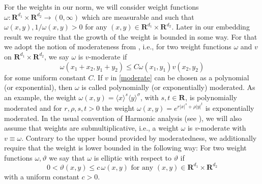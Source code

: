 \documentclass[a4paper]{article}
\newcommand{\rr}[1]{\mathbf{R}^{#1}}
\newcommand{\eabs}[1]{\langle #1\rangle}     %
\numberwithin{equation}{section}
\theoremstyle{remark}
\begin{document}
For the weights in our norm, we will consider weight functions
$\omega : \rr{d_1}\times\rr{d_2} \rightarrow (0, \infty)$
which are measurable and such that $\omega(x,y), 1/\omega(x,y)>0$
for any $(x,y)\in \rr{d_1}\times\rr{d_2}$.
Later in our embedding result
we require that the growth of the weight is bounded in some way.
For that we adopt the notion of moderateness from \cite{Pilipovic11MicroLocalAnalysisFourier}, i.e.,
for two weight functions $\omega$ and $v$
on $\rr{d_1}\times\rr{d_2}$,
we say $\omega$ is $v$-moderate if
\begin{equation}\label{moderate}
	\omega (x_1+x_2, y_1+y_2) \leq C\omega (x_1,y_1)v(x_2,y_2)
\end{equation}
for some uniform constant $C$.
If $v$
in \eqref{moderate} can be chosen as a polynomial (or exponential),
then $\omega$ is
called polynomially
(or exponentially) moderated.
As an example, the weight
$\omega (x, y )=\eabs x ^s\eabs y ^\sigma$,
with $s, t\in \rr{}$,
is polynomially moderated
and for $r,\rho, s, t> 0$
the weight $\omega(x,y ) = e^{r|x|^s + \rho|y|^t}$
is exponentially moderated.
In the usual convention of Harmonic analysis (see \cite[Page 4]{Hormander05AnalysisLinearPartial}),
we will also assume that weights are submultiplicative, i.e., a weight $\omega$ is $v$-moderate with $v\equiv\omega$.
Contrary to the upper bound provided by moderatedness,
we additionally require that the weight is lower bounded in the following way:
For two weight functions $\omega, \vartheta$
we say that $\omega$ is elliptic
with respect to $\vartheta$
if 
\begin{equation}\label{eq:ellipticity_cond}
0<\vartheta(x, y)\leq c\,\omega(x,y)
\text{ for any }(x,y) \in \rr{d_1}\times\rr{d_2}
\end{equation}
with a uniform constant $c>0$.
\end{document}
